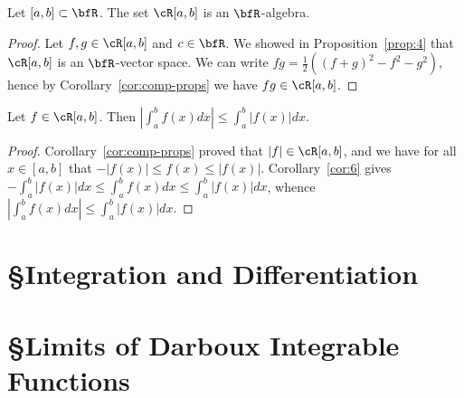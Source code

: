 \documentclass[10pt,twoside,openany]{memoir}
\begin{document}
    \begin{corollary}
        Let $[a,b] \subset \bfR$. The set $\cR[a,b]$ is an $\bfR$-algebra.
    \end{corollary}
        \begin{proof}
            Let $f,g \in \cR[a,b]$ and $c \in \bfR$. We showed in Proposition~\ref{prop:4} that $\cR[a,b]$ is an $\bfR$-vector space. We can write $fg = \frac{1}{2}((f+g)^2 - f^2 - g^2)$, hence by Corollary~\ref{cor:comp-props} we have $fg \in \cR[a,b]$.
        \end{proof}

    \begin{corollary}
        Let $f \in \cR[a,b]$. Then $\left| \int_a^b f(x)dx \right| \leq \int_a^b |f(x)|dx$.
    \end{corollary}
        \begin{proof}
            Corollary~\ref{cor:comp-props} proved that $|f| \in \cR[a,b]$, and we have for all $x \in [a,b]$ that $-|f(x)| \leq f(x) \leq |f(x)|$. Corollary~\ref{cor:6} gives $-\int_a^b |f(x)|dx \leq \int_a^b f(x)dx \leq \int_a^b|f(x)|dx$, whence $\left| \int_a^b f(x)dx \right| \leq \int_a^b |f(x)|dx$.
        \end{proof}

\section*{\S\:\:Integration and Differentiation}

\section*{\S\:\:Limits of Darboux Integrable Functions}
    \begin{example}
        
    \end{example}
\end{document}
